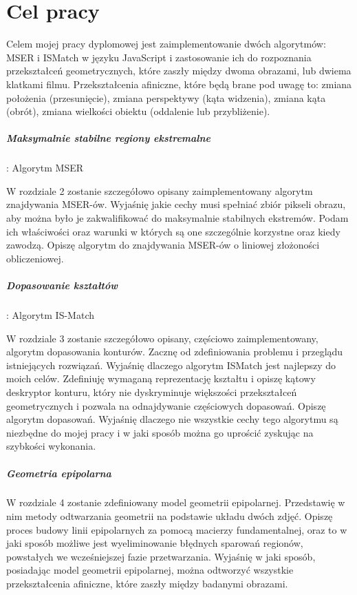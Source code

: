 \section{Cel pracy}

Celem mojej pracy dyplomowej jest zaimplementowanie dwóch algorytmów: MSER i
ISMatch w języku JavaScript i zastosowanie ich do rozpoznania przekształceń
geometrycznych, które zaszły między dwoma obrazami, lub dwiema klatkami filmu.
Przekształcenia afiniczne, które będą brane pod uwagę to: zmiana położenia
(przesunięcie), zmiana perspektywy (kąta widzenia), zmiana kąta (obrót), zmiana
wielkości obiektu (oddalenie lub przybliżenie).

\subparagraph{Maksymalnie stabilne regiony ekstremalne}: Algorytm MSER

W rozdziale 2 zostanie szczegółowo opisany zaimplementowany algorytm
znajdywania MSER-ów. Wyjaśnię jakie cechy musi spełniać zbiór pikseli obrazu,
aby można było je zakwalifikować do maksymalnie stabilnych ekstremów.  Podam
ich właściwości oraz warunki w których są one szczególnie korzystne oraz kiedy
zawodzą. Opiszę algorytm do znajdywania MSER-ów o liniowej złożoności
obliczeniowej.

\subparagraph{Dopasowanie kształtów}: Algorytm IS-Match

W rozdziale 3 zostanie szczegółowo opisany, częściowo zaimplementowany,
algorytm dopasowania konturów. Zacznę od zdefiniowania problemu i przeglądu
istniejących rozwiązań. Wyjaśnię dlaczego algorytm ISMatch jest najlepszy do
moich celów. Zdefiniuję wymaganą reprezentację kształtu i opiszę kątowy
deskryptor konturu, który nie dyskryminuje większości przekształceń
geometrycznych i pozwala na odnajdywanie częściowych dopasowań. Opiszę algorytm
dopasowań. Wyjaśnię dlaczego nie wszystkie cechy tego algorytmu są niezbędne do
mojej pracy i w jaki sposób można go uprościć zyskując na szybkości wykonania.

\subparagraph{Geometria epipolarna}

W rozdziale 4 zostanie zdefiniowany model geometrii epipolarnej. Przedstawię w
nim metody odtwarzania geometrii na podstawie układu dwóch zdjęć. Opiszę proces
budowy linii epipolarnych za pomocą macierzy fundamentalnej, oraz to w jaki
sposób możliwe jest wyeliminowanie błędnych sparowań regionów, powstałych we
wcześniejszej fazie przetwarzania. Wyjaśnię w jaki sposób, posiadając model
geometrii epipolarnej, można odtworzyć wszystkie przekształcenia afiniczne,
które zaszły między badanymi obrazami.


